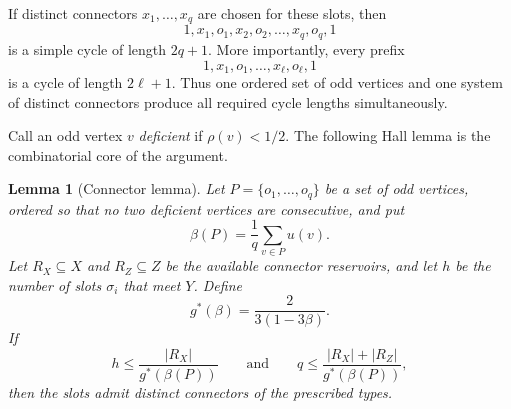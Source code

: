 \documentclass{article}
\newtheorem{lemma}[theorem]{Lemma}
\theoremstyle{remark}
\begin{document}
If distinct connectors \(x_1,\ldots,x_q\) are chosen for these slots,
then
\begin{equation}\label{eq:covering-cycle}
 1,x_1,o_1,x_2,o_2,\ldots,x_q,o_q,1
\end{equation}
is a simple cycle of length \(2q+1\). More importantly, every prefix
\[
 1,x_1,o_1,\ldots,x_\ell,o_\ell,1
\]
is a cycle of length \(2\ell+1\). Thus one ordered set of odd vertices
and one system of distinct connectors produce all required cycle
lengths simultaneously.

Call an odd vertex \(v\) \emph{deficient} if \(\rho(v)<1/2\). The
following Hall lemma is the combinatorial core of the argument.

\begin{lemma}[Connector lemma]\label{lem:connector}
Let \(P=\{o_1,\ldots,o_q\}\) be a set of odd vertices, ordered so that
no two deficient vertices are consecutive, and put
\[
 \beta(P)=\frac1q\sum_{v\in P}u(v).
\]
Let \(R_X\subseteq X\) and \(R_Z\subseteq Z\) be the available
connector reservoirs, and let \(h\) be the number of slots
\(\sigma_i\) that meet \(Y\). Define
\[
 g^\ast(\beta)=\frac{2}{3(1-3\beta)}.
\]
If
\begin{equation}\label{eq:transport-abstract}
 h\leq\frac{|R_X|}{g^\ast(\beta(P))}
 \qquad\text{and}\qquad
 q\leq\frac{|R_X|+|R_Z|}{g^\ast(\beta(P))},
\end{equation}
then the slots admit distinct connectors of the prescribed types.
\end{lemma}
\end{document}
